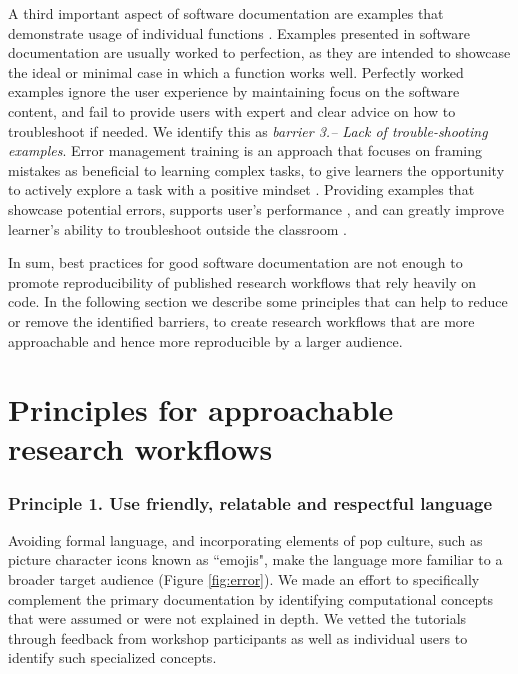 \documentclass[12pt]{article}
\begin{document}
A third important aspect of software documentation are examples that demonstrate usage of individual functions \citep{karimzadeh2018top}.
Examples presented in software documentation are usually worked to perfection, as they are intended to showcase the ideal or minimal case in which a function works well.
Perfectly worked examples ignore the user experience by maintaining focus on the software content, and fail to provide users with expert and clear advice on how to troubleshoot if needed.
We identify this as \textit{barrier 3.-- Lack of trouble-shooting examples}.
Error management training is an approach that focuses on framing mistakes as beneficial to learning complex tasks, to give learners the opportunity to actively explore a task with a positive mindset \citep{frese1995error}.
Providing examples that showcase potential errors, supports user's performance \citep{steele2014error}, and can greatly improve learner's ability to troubleshoot outside the classroom \citep{shannon2015live, nederbragt2020ten}.


In sum, best practices for good software documentation are not enough to promote reproducibility of published research workflows that rely heavily on code.
In the following section we describe some principles that can help to reduce or remove the identified barriers, to create research workflows that are more approachable and hence more reproducible by a larger audience.

\section*{Principles for approachable research workflows}
\label{sec:addressing}

\subsubsection*{Principle 1. Use friendly, relatable and respectful language}


Avoiding formal language, and incorporating elements of pop culture, such as picture character icons known as ``emojis", make the language more familiar to a broader target audience (Figure \ref{fig:error}). We made an effort to specifically complement the primary documentation by identifying computational concepts that were assumed or were not explained in depth.
We vetted the tutorials through feedback from workshop participants as well as individual users to identify such specialized concepts.
\end{document}
